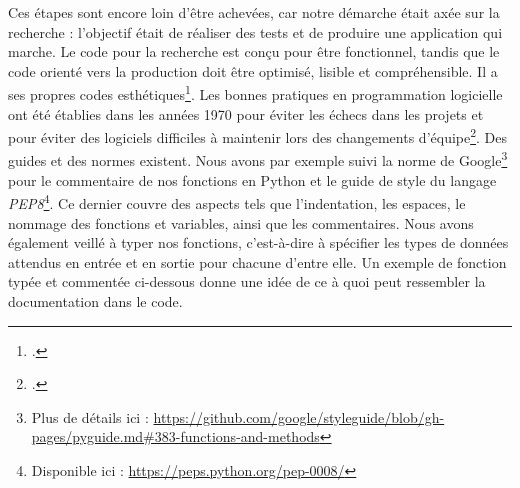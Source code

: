 Ces étapes sont encore loin d'être achevées, car notre démarche était axée sur la recherche : l'objectif était de réaliser des tests et de produire une application qui marche. Le code pour la recherche est conçu pour être fonctionnel, tandis que le code orienté vers la production doit être optimisé, lisible et  compréhensible. Il a ses propres codes esthétiques\footcite{depaz_role_2023}. Les bonnes pratiques en programmation logicielle ont été établies dans les années 1970 pour éviter les échecs dans les projets et pour éviter des logiciels difficiles à maintenir lors des changements d'équipe\footcite{depaz_role_2023}. Des guides et des normes existent. Nous avons par exemple suivi la norme de Google\footnote{Plus de détails ici : \url{https://github.com/google/styleguide/blob/gh-pages/pyguide.md\#383-functions-and-methods}} pour le commentaire de nos fonctions en Python et le guide de style du langage \emph{PEP8}\footnote{Disponible ici : \url{https://peps.python.org/pep-0008/}}. Ce dernier couvre des aspects tels que l'indentation, les espaces, le nommage des fonctions et variables, ainsi que les commentaires. Nous avons également veillé à typer nos fonctions, c'est-à-dire à spécifier les types de données attendus en entrée et en sortie pour chacune d'entre elle. Un exemple de fonction typée et commentée ci-dessous donne une idée de ce à quoi peut ressembler la documentation dans le code.


